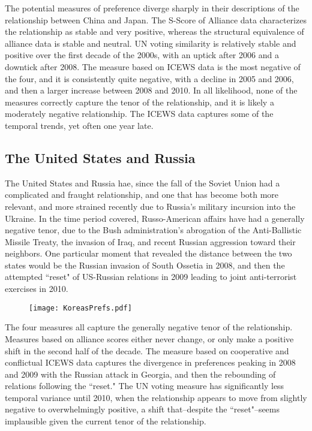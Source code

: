 \documentclass[12pt,onesided,fullpage]{amsart}
\begin{document}
The potential measures of preference diverge sharply in their descriptions of the relationship between China and Japan. The S-Score of Alliance data characterizes the relationship as stable and very positive, whereas the structural equivalence of alliance data is stable and neutral. UN voting similarity is relatively stable and positive over the first decade of the 2000s, with an uptick after 2006 and a downtick after 2008. The measure based on ICEWS data is the most negative of the four, and it is consistently quite negative, with a decline in 2005 and 2006,  and then a larger increase between 2008 and 2010. In all likelihood, none of the measures correctly capture the tenor of the relationship, and it is likely a moderately negative relationship. The ICEWS data captures some of the temporal trends, yet often one year late.

\subsection{The United States and Russia}

The United States and Russia hae, since the fall of the Soviet Union had a complicated and fraught relationship, and one that has become both more relevant, and more strained recently due to Russia's military incursion into the Ukraine. In the time period covered, Russo-American affairs have had a generally negative tenor, due to the Bush administration's abrogation of the Anti-Ballistic Missile Treaty, the invasion of Iraq, and recent Russian aggression toward their neighbors. One particular moment that revealed the distance between the two states would be the Russian invasion of South Ossetia in 2008, and then the attempted ``reset" of US-Russian relations in 2009 leading to joint anti-terrorist exercises in 2010.  
\begin{figure}
\texttt{[image: KoreasPrefs.pdf]}
\end{figure}

The four measures all capture the generally negative tenor of the relationship. Measures based on alliance scores either never change, or only make a positive shift in the second half of the decade. The measure based on cooperative and conflictual ICEWS data captures the divergence in preferences peaking in 2008 and 2009 with the Russian attack in Georgia, and then the rebounding of relations following the ``reset." The UN voting measure has significantly less temporal variance until 2010, when the relationship appears to move from slightly negative to overwhelmingly positive, a shift that--despite the ``reset"--seems implausible given the current tenor of the relationship.
\end{document}
